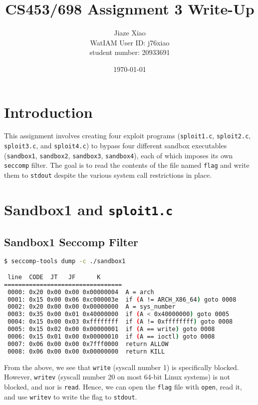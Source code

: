 \documentclass[11pt]{article}
\begin{document}
\title{CS453/698 Assignment 3 Write-Up}
\author{Jiaze Xiao \\ WatIAM User ID: j76xiao \\ student number: 20933691}
\date{\today}
\maketitle

\section{Introduction}
This assignment involves creating four exploit programs (\texttt{sploit1.c}, \texttt{sploit2.c},
\texttt{sploit3.c}, and \texttt{sploit4.c}) to bypass four different sandbox executables (\texttt{sandbox1},
\texttt{sandbox2}, \texttt{sandbox3}, \texttt{sandbox4}), each of which imposes its own \texttt{seccomp}
filter. The goal is to read the contents of the file named \texttt{flag} and write them to \texttt{stdout} despite
the various system call restrictions in place.

\section{Sandbox1 and \texttt{sploit1.c}}

\subsection{Sandbox1 Seccomp Filter}
\begin{lstlisting}[language=bash]
$ seccomp-tools dump -c ./sandbox1

 line  CODE  JT   JF      K
=================================
 0000: 0x20 0x00 0x00 0x00000004  A = arch
 0001: 0x15 0x00 0x06 0xc000003e  if (A != ARCH_X86_64) goto 0008
 0002: 0x20 0x00 0x00 0x00000000  A = sys_number
 0003: 0x35 0x00 0x01 0x40000000  if (A < 0x40000000) goto 0005
 0004: 0x15 0x00 0x03 0xffffffff  if (A != 0xffffffff) goto 0008
 0005: 0x15 0x02 0x00 0x00000001  if (A == write) goto 0008
 0006: 0x15 0x01 0x00 0x00000010  if (A == ioctl) goto 0008
 0007: 0x06 0x00 0x00 0x7fff0000  return ALLOW
 0008: 0x06 0x00 0x00 0x00000000  return KILL
\end{lstlisting}

From the above, we see that \texttt{write} (syscall number 1) is specifically blocked. However,
\texttt{writev} (syscall number 20 on most 64-bit Linux systems) is not blocked, and nor is \texttt{read}.
Hence, we can open the \texttt{flag} file with \texttt{open}, read it, and use \texttt{writev} to write the
flag to \texttt{stdout}.
\end{document}
